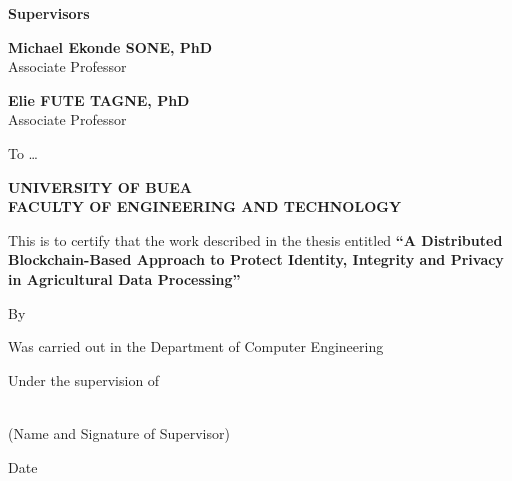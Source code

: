 \documentclass[12pt,a4paper,oneside]{book}
\begin{document}
\begin{singlespace}
\noindent\textbf{Supervisors}

\vspace{1.0\baselineskip}

\noindent\textbf{Michael Ekonde SONE, PhD}\\
Associate Professor

\vspace{0.8\baselineskip}

\noindent\textbf{Elie FUTE TAGNE, PhD}\\
Associate Professor

\vfill

\begin{center}
  \textbf{\monthyear}
\end{center}

\vspace{1.5\baselineskip}

\end{singlespace}
\clearpage
 

\setcounter{page}{2}                     

\vspace{2\baselineskip}
\begin{center}
To \dots
\end{center}
\clearpage
\begin{singlespace}
\vspace{\baselineskip}
\begin{center}{\bfseries UNIVERSITY OF BUEA}\\
{\bfseries FACULTY OF ENGINEERING AND TECHNOLOGY}\end{center}
\vspace{2\baselineskip}

This is to certify that the work described in the thesis entitled
\textbf{``A Distributed Blockchain-Based Approach to Protect Identity,
Integrity and Privacy in Agricultural Data Processing''}

\vspace{\baselineskip}
By \hrulefill

\vspace{\baselineskip}
Was carried out in the Department of Computer Engineering

\vspace{\baselineskip}
Under the supervision of

\vspace{2\baselineskip}
\hrulefill\\
(Name and Signature of Supervisor)

\vspace{2\baselineskip}
Date \hrulefill
\end{singlespace}
\clearpage
\end{document}
